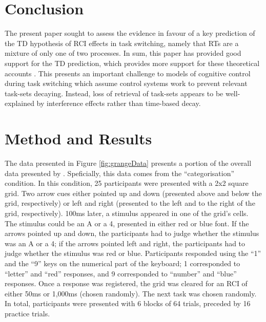 \documentclass[a4paper, jou, natbib]{apa6}
\begin{document}
\section{Conclusion}
The present paper sought to assess the evidence in favour of a key prediction of the TD hypothesis of RCI effects in task switching, namely that RTs are a mixture of only one of two processes. In sum, this paper has provided good support for the TD prediction, which provides more support for these theoretical accounts \citep{Grange2015, Horoufchin2011, Horoufchin2011a}. This presents an important challenge to models of cognitive control during task switching which assume control systems work to prevent relevant task-sets decaying. Instead, loss of retrieval of task-sets appears to be well-explained by interference effects rather than time-based decay.





\appendix
\section{Method and Results \citep{Grangeinrevision}}
The data presented in Figure \ref{fig:grangeData} presents a portion of the overall data presented by \cite{Grangeinrevision}. Speficially, this data comes from the ``categorisation'' condition. In this condition, 25 participants were presented with a 2x2 square grid. Two arrow cues either pointed up and down (presented above and below the grid, respectively) or left and right (presented to the left and to the right of the grid, respectively). 100ms later, a stimulus appeared in one of the grid's cells. The stimulus could be an A or a 4, presented in either red or blue font. If the arrows pointed up and down, the participants had to judge whether the stimulus was an A or a 4; if the arrows pointed left and right, the participants had to judge whether the stimulus was red or blue. Participants responded using the ``1'' and the ``9'' keys on the numerical part of the keyboard; 1 corresponded to ``letter'' and ``red'' responses, and 9 corresponded to ``number'' and ``blue'' responses. Once a response was registered, the grid was cleared for an RCI of either 50ms or 1,000ms (chosen randomly). The next task was chosen randomly. In total, participants were presented with 6 blocks of 64 trials, preceded by 16 practice trials.
\end{document}
